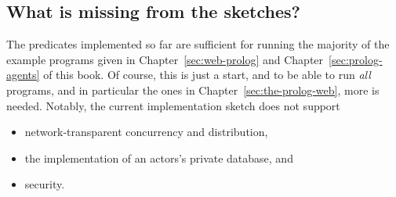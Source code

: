%
%
%
%
%
%
%    
%
%



\subsection{What is missing from the sketches?}

\noindent The predicates implemented so far are sufficient for running the majority of the example programs given in Chapter~\ref{sec:web-prolog} and Chapter~\ref{sec:prolog-agents} of this book. Of course, this is just a start, and to be able to run \textit{all} programs, and in particular the ones in Chapter~\ref{sec:the-prolog-web}, more is needed. Notably, the current implementation sketch does not support

\begin{itemize}
\item network-transparent concurrency and distribution,
\item the implementation of an actors's private database, and
\item security.
\end{itemize}



